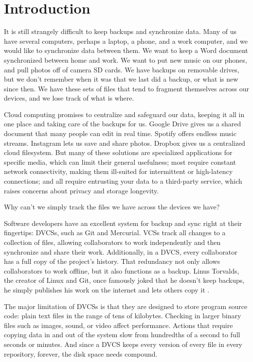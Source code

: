 \chapter{Introduction}

It is still strangely difficult to keep backups and synchronize data. Many of us
have several computers, perhaps a laptop, a phone, and a work computer, and we
would like to synchronize data between them. We want to keep a Word document
synchronized between home and work. We want to put new music on our phones, and
pull photos off of camera SD cards. We have backups on removable drives, but we
don't remember when it was that we last did a backup, or what is new since then.
We have these sets of files that tend to fragment themselves across our devices,
and we lose track of what is where.

Cloud computing promises to centralize and safeguard our data, keeping it all in
one place and taking care of the backups for us. Google Drive gives us a shared
document that many people can edit in real time. Spotify offers endless music
streams. Instagram lets us save and share photos. Dropbox gives us a centralized
cloud filesystem. But many of these solutions are specialized applications for
specific media, which can limit their general usefulness; most require constant
network connectivity, making them ill-suited for intermittent or high-latency
connections; and all require entrusting your data to a third-party service,
which raises concerns about privacy and storage longevity.

Why can't we simply track the files we have across the devices we have?

Software developers have an excellent system for backup and sync right at their
fingertips: \glspl{DVCS}, such as Git and Mercurial. \Glspl{VCS} track all
changes to a collection of files, allowing collaborators to work independently
and then synchronize and share their work. Additionally, in a \gls{DVCS}, every
collaborator has a full copy of the project's history. That redundancy not only
allows collaborators to work offline, but it also functions as a backup. Linus
Torvalds, the creator of Linux and Git, once famously joked that he doesn't keep
backups, he simply publishes his work on the internet and lets others copy it
\cite{linus_no_backups}.

The major limitation of \glspl{DVCS} is
that they are designed to store program source code: plain text files in the
range of tens of kilobytes. Checking in larger binary files such as images,
sound, or video affect performance. Actions that require copying data in and out
of the system slow from hundredths of a second to full seconds or minutes. And
since a \gls{DVCS} keeps every version of every file in every \gls{repository},
forever, the disk space needs compound.

